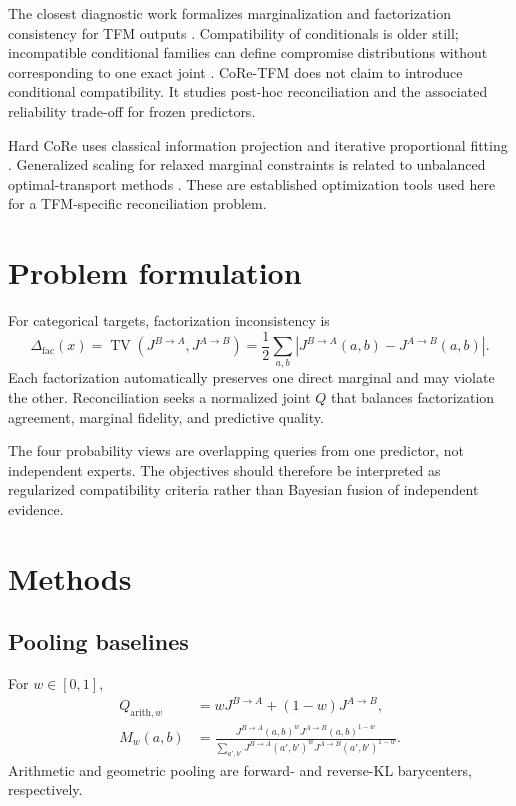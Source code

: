 \documentclass[pdflatex,sn-basic]{sn-jnl}
\newcommand{\TV}{\operatorname{TV}}
\newcommand{\Jone}{J^{B\rightarrow A}}
\newcommand{\Jtwo}{J^{A\rightarrow B}}
\theoremstyle{plain}
\begin{document}
The closest diagnostic work formalizes marginalization and factorization consistency for TFM outputs \citep{klotergens2026agree}. Compatibility of conditionals is older still; incompatible conditional families can define compromise distributions without corresponding to one exact joint \citep{mure2017compromise}. CoRe-TFM does not claim to introduce conditional compatibility. It studies post-hoc reconciliation and the associated reliability trade-off for frozen predictors.

Hard CoRe uses classical information projection and iterative proportional fitting \citep{benamou2015bregman}. Generalized scaling for relaxed marginal constraints is related to unbalanced optimal-transport methods \citep{cuturi2013sinkhorn,chizat2018scaling}. These are established optimization tools used here for a TFM-specific reconciliation problem.

\section{Problem formulation}\label{sec:problem}
For categorical targets, factorization inconsistency is
\begin{equation}
\Delta_{\mathrm{fac}}(x)=\TV(\Jone,\Jtwo)=\frac12\sum_{a,b}|\Jone(a,b)-\Jtwo(a,b)|.
\end{equation}
Each factorization automatically preserves one direct marginal and may violate the other. Reconciliation seeks a normalized joint $Q$ that balances factorization agreement, marginal fidelity, and predictive quality.

The four probability views are overlapping queries from one predictor, not independent experts. The objectives should therefore be interpreted as regularized compatibility criteria rather than Bayesian fusion of independent evidence.

\section{Methods}\label{sec:methods}
\subsection{Pooling baselines}
For $w\in[0,1]$,
\begin{align}
Q_{\mathrm{arith},w}&=w\Jone+(1-w)\Jtwo,\\
M_w(a,b)&=\frac{\Jone(a,b)^w\Jtwo(a,b)^{1-w}}{\sum_{a',b'}\Jone(a',b')^w\Jtwo(a',b')^{1-w}}.
\end{align}
Arithmetic and geometric pooling are forward- and reverse-KL barycenters, respectively.
\end{document}
